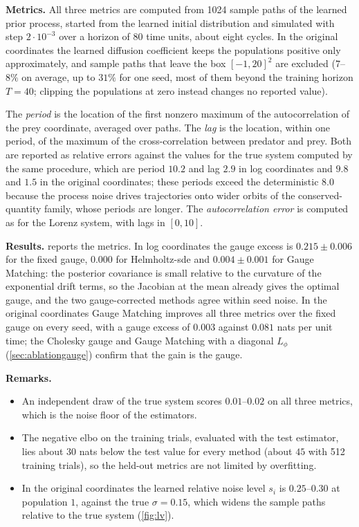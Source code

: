 \documentclass{article} %
\begin{document}
\textbf{Metrics.} All three metrics are computed from 1024 sample paths of the learned prior process, started from the learned initial distribution and simulated with step $2 \cdot 10^{-3}$ over a horizon of $80$ time units, about eight cycles. In the original coordinates the learned diffusion coefficient keeps the populations positive only approximately, and sample paths that leave the box $[-1, 20]^2$ are excluded ($7$--$8\%$ on average, up to $31\%$ for one seed, most of them beyond the training horizon $T = 40$; clipping the populations at zero instead changes no reported value).

The \emph{period} is the location of the first nonzero maximum of the autocorrelation of the prey coordinate, averaged over paths. The \emph{lag} is the location, within one period, of the maximum of the cross-correlation between predator and prey. Both are reported as relative errors against the values for the true system computed by the same procedure, which are period $10.2$ and lag $2.9$ in log coordinates and $9.8$ and $1.5$ in the original coordinates; these periods exceed the deterministic $8.0$ because the process noise drives trajectories onto wider orbits of the conserved-quantity family, whose periods are longer. The \emph{autocorrelation error} is computed as for the Lorenz system, with lags in $[0, 10]$.

\textbf{Results.}  reports the metrics. In log coordinates the gauge excess is $0.215 \pm 0.006$ for the fixed gauge, $0.000$ for Helmholtz-\gls{sde} and $0.004 \pm 0.001$ for Gauge Matching: the posterior covariance is small relative to the curvature of the exponential drift terms, so the Jacobian at the mean already gives the optimal gauge, and the two gauge-corrected methods agree within seed noise. In the original coordinates Gauge Matching improves all three metrics over the fixed gauge on every seed, with a gauge excess of $0.003$ against $0.081$ nats per unit time; the Cholesky gauge and Gauge Matching with a diagonal $L_\phi$ (\cref{sec:ablationgauge}) confirm that the gain is the gauge.

\textbf{Remarks.}
\begin{itemize}[nosep,leftmargin=*]
    \item An independent draw of the true system scores $0.01$--$0.02$ on all three metrics, which is the noise floor of the estimators.
    \item The negative \gls{elbo} on the training trials, evaluated with the test estimator, lies about $30$ nats below the test value for every method (about $45$ with 512 training trials), so the held-out metrics are not limited by overfitting.
    \item In the original coordinates the learned relative noise level $s_i$ is $0.25$--$0.30$ at population $1$, against the true $\sigma = 0.15$, which widens the sample paths relative to the true system (\cref{fig:lv}).
\end{itemize}
\end{document}
